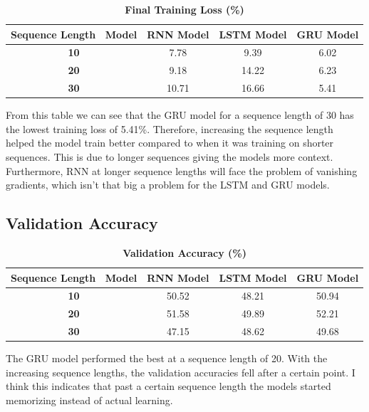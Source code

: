 \documentclass[a4paper]{article}
\begin{document}
\begin{table}[H]
    \centering
    \caption{\textbf{Final Training Loss (\%)}}
    \label{tab:finalTL}
    \begin{tabular}{| c | c | c | c |}
        \hline
        Sequence Length \ Model & \textbf{RNN Model} & \textbf{LSTM Model} & \textbf{GRU Model} \\
        \hline
        \textbf{10} & 7.78 & 9.39 & 6.02 \\
        \hline
        \textbf{20} & 9.18 & 14.22 & 6.23 \\
        \hline
        \textbf{30} & 10.71 & 16.66 & 5.41 \\
        \hline
    \end{tabular}
\end{table}

From this table we can see that the GRU model for a sequence length of 30 has the lowest training loss of 5.41\%. Therefore, increasing the sequence length helped the model train better compared to when it was training on shorter sequences. This is due to longer sequences giving the models more context. Furthermore, RNN at longer sequence lengths will face the problem of vanishing gradients, which isn't that big a problem for the LSTM and GRU models.

\subsection*{\textbf{Validation Accuracy}}

\begin{table}[H]
    \centering
    \caption{\textbf{Validation Accuracy (\%)}}
    \label{tab:valAcc}
    \begin{tabular}{| c | c | c | c |}
        \hline
        Sequence Length \ Model & \textbf{RNN Model} & \textbf{LSTM Model} & \textbf{GRU Model} \\
        \hline
        \textbf{10} & 50.52 & 48.21 & 50.94 \\
        \hline
        \textbf{20} & 51.58 & 49.89 & 52.21 \\
        \hline
        \textbf{30} & 47.15 & 48.62 & 49.68 \\
        \hline
    \end{tabular}
\end{table}

The GRU model performed the best at a sequence length of 20. With the increasing sequence lengths, the validation accuracies fell after a certain point. I think this indicates that past a certain sequence length the models started memorizing instead of actual learning.
\end{document}
